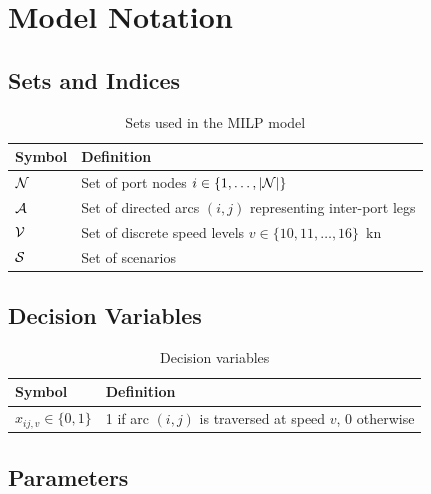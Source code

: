 \section{Model Notation}
\label{app:notation}

\subsection{Sets and Indices}
\label{app:notation:sets}

\begin{table}[h]
\centering
\caption{Sets used in the MILP model}
\label{tab:notation_sets}
\begin{tabular}{lp{9cm}}
  \toprule
  Symbol & Definition \\
  \midrule
  $\mathcal{N}$ & Set of port nodes $i \in \{1, \ldots, |\mathcal{N}|\}$ \\
  $\mathcal{A}$ & Set of directed arcs $(i,j)$ representing inter-port legs \\
  $\mathcal{V}$ & Set of discrete speed levels $v \in \{10, 11, \ldots, 16\}$~kn \\
  $\mathcal{S}$ & Set of scenarios \\
  \bottomrule
\end{tabular}
\end{table}

\subsection{Decision Variables}
\label{app:notation:vars}

\begin{table}[h]
\centering
\caption{Decision variables}
\label{tab:notation_vars}
\begin{tabular}{lp{9cm}}
  \toprule
  Symbol & Definition \\
  \midrule
  $x_{ij,v} \in \{0,1\}$ & 1 if arc $(i,j)$ is traversed at speed $v$, 0 otherwise \\
  \bottomrule
\end{tabular}
\end{table}

\subsection{Parameters}
\label{app:notation:params}

